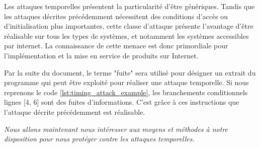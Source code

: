 Les attaques temporelles présentent la particularité d'être génériques. Tandis que les attaques décrites précédemment nécessitent des conditions d'accès ou d'initialisation plus importantes, cette classe d'attaque présente l'avantage d'être réalisable sur tous les types de systèmes, et notamment les systèmes accessibles par internet. La connaissance de cette menace est donc primordiale pour l'implémentation et la mise en service de produits sur Internet.\medbreak

Par la suite du document, le terme "fuite" sera utilisé pour désigner un extrait du programme qui peut être exploité pour réaliser une attaque temporelle. Si nous reprenons le code \ref{lst:timing_attack_example}, les branchements conditionnels lignes [4, 6] sont des fuites d'informations. C'est grâce à ces instructions que l'attaque décrite précédemment est réalisable.\medbreak

\vfill
\textit{Nous allons maintenant nous intéresser aux moyens et méthodes à notre disposition pour nous protéger contre les attaques temporelles.}



